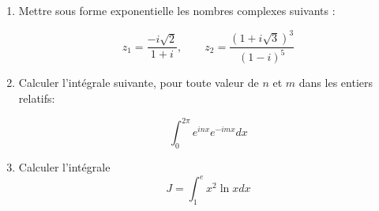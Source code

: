 

\begin{enumerate}[itemsep = 1.5em]
    \item Mettre sous forme exponentielle les nombres complexes suivants : 

$$z_{1}=\frac{-i \sqrt{2}}{1+i}, \qquad z_{2}=\frac{(1+i \sqrt{3})^3}{(1-i)^5}$$


\item Calculer l'intégrale suivante, pour toute valeur de $n$ et $m$ dans les entiers relatifs:

$$\int_0^{2\pi} e^{i n x} e^{-i m x} dx$$


\item Calculer l'intégrale $$J=\int_1^e x^2\ln xdx$$
\end{enumerate}